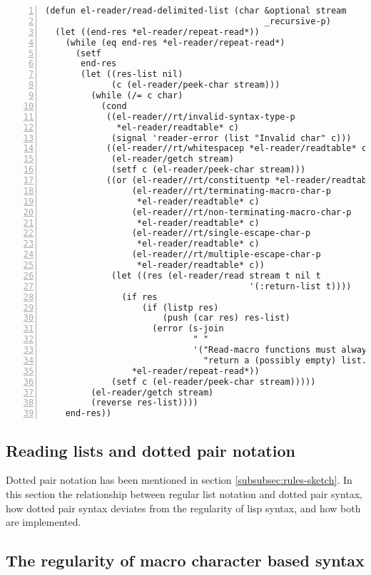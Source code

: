 \documentclass[a4paper,10pt,twoside]{report}
\newcommand{\fun}[1]{\texttt{#1}}
\begin{document}
\begin{lstlisting}[style=lispcode,label={code:read-delim-list},caption={Code for
  \fun{read-delimited-list}},numbers=left]
(defun el-reader/read-delimited-list (char &optional stream
                                           _recursive-p)
  (let ((end-res *el-reader/repeat-read*))
    (while (eq end-res *el-reader/repeat-read*)
      (setf
       end-res
       (let ((res-list nil)
             (c (el-reader/peek-char stream)))
         (while (/= c char)
           (cond
            ((el-reader//rt/invalid-syntax-type-p
              *el-reader/readtable* c)
             (signal 'reader-error (list "Invalid char" c)))
            ((el-reader//rt/whitespacep *el-reader/readtable* c)
             (el-reader/getch stream)
             (setf c (el-reader/peek-char stream)))
            ((or (el-reader//rt/constituentp *el-reader/readtable* c)
                 (el-reader//rt/terminating-macro-char-p
                  *el-reader/readtable* c)
                 (el-reader//rt/non-terminating-macro-char-p
                  *el-reader/readtable* c)
                 (el-reader//rt/single-escape-char-p
                  *el-reader/readtable* c)
                 (el-reader//rt/multiple-escape-char-p
                  *el-reader/readtable* c))
             (let ((res (el-reader/read stream t nil t
                                        '(:return-list t))))
               (if res
                   (if (listp res)
                       (push (car res) res-list)
                     (error (s-join
                             " "
                             '("Read-macro functions must always "
                               "return a (possibly empty) list."))))
                 *el-reader/repeat-read*))
             (setf c (el-reader/peek-char stream)))))
         (el-reader/getch stream)
         (reverse res-list))))
    end-res))
\end{lstlisting}

\subsection{Reading lists and dotted pair notation}
\label{subsec:list-dotted-pair}

Dotted pair notation has been mentioned in section \ref{subsubsec:rules-sketch}.
In this section the relationship between regular list notation and dotted pair
syntax, how dotted pair syntax deviates from the regularity of lisp syntax, and
how both are implemented.

\subsection{The regularity of macro character based syntax}
\label{subsec:reg-by-macro}
\end{document}
